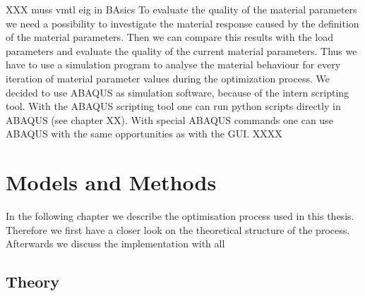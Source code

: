 
    XXX muss vmtl eig in BAsics
    To evaluate the quality of the material parameters we need a possibility to investigate the material response caused by the definition of the material parameters. Then we can compare this results with the load parameters and evaluate the quality of the current material parameters. Thus we have to use a simulation program to analyse the material behaviour for every iteration of material parameter values during the optimization process. We decided to use ABAQUS as simulation software, because of the intern scripting tool. With the ABAQUS scripting tool one can run python scripts directly in ABAQUS (see chapter XX). With special ABAQUS commands one can use ABAQUS with the same opportunities as with the GUI. 
    XXXX
    

    
    \chapter{Models and Methods}

    In the following chapter we describe the optimisation process used in this thesis. Therefore we first have a closer look on the theoretical structure of the process. Afterwards we discuss the implementation with all 

    \section{Theory}

